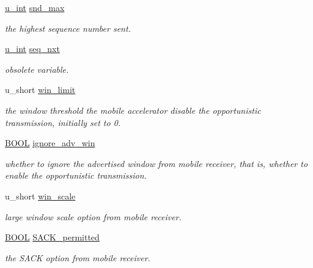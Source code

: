\begin{DoxyCompactItemize}
\hyperlink{split__tcp__gateway_8h_ac319c165d52643e43249fe003e18bdf3}{u\-\_\-int} \hyperlink{structserverState_a40a01ae835807ebee67bcee468cec70a}{snd\-\_\-max}
\begin{DoxyCompactList}\small\item\em the highest sequence number sent. \end{DoxyCompactList}\item 
\hyperlink{split__tcp__gateway_8h_ac319c165d52643e43249fe003e18bdf3}{u\-\_\-int} \hyperlink{structserverState_ac444397fe03359cdc31e8c26e4000a0a}{seq\-\_\-nxt}
\begin{DoxyCompactList}\small\item\em obsolete variable. \end{DoxyCompactList}\item 
u\-\_\-short \hyperlink{structserverState_a48a2d3d9f312ba2ea9c9f71e91dcb9e7}{win\-\_\-limit}
\begin{DoxyCompactList}\small\item\em the window threshold the mobile accelerator disable the opportunistic transmission, initially set to 0. \end{DoxyCompactList}\item 
\hyperlink{split__tcp__gateway_8h_a050c65e107f0c828f856a231f4b4e788}{\-B\-O\-O\-L} \hyperlink{structserverState_a9bd2d2f35d66ead45f5d6b55de2b93ae}{ignore\-\_\-adv\-\_\-win}
\begin{DoxyCompactList}\small\item\em whether to ignore the advertised window from mobile receiver, that is, whether to enable the opportunistic transmission. \end{DoxyCompactList}\item 
u\-\_\-short \hyperlink{structserverState_ae9f552f7d1731ec394b5d003650b046c}{win\-\_\-scale}
\begin{DoxyCompactList}\small\item\em large window scale option from mobile receiver. \end{DoxyCompactList}\item 
\hyperlink{split__tcp__gateway_8h_a050c65e107f0c828f856a231f4b4e788}{\-B\-O\-O\-L} \hyperlink{structserverState_ad0e4f529996482b0658b0a65f593d687}{\-S\-A\-C\-K\-\_\-permitted}
\begin{DoxyCompactList}\small\item\em the \-S\-A\-C\-K option from mobile receiver. \end{DoxyCompactList}\end{DoxyCompactItemize}


